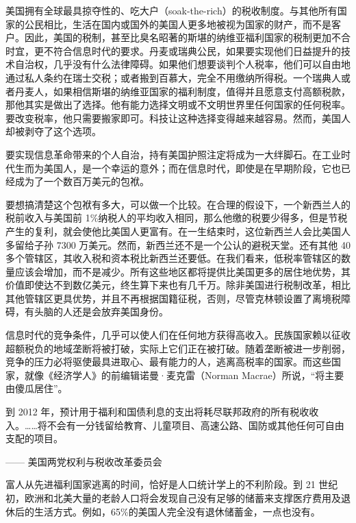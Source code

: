 美国拥有全球最具掠夺性的、吃大户（soak-the-rich）的税收制度。与其他所有国家的公民相比，生活在国内或国外的美国人更多地被视为国家的财产，而不是客户。因此，美国的税制，甚至比臭名昭著的斯堪的纳维亚福利国家的税制更加不合时宜，更不符合信息时代的要求。丹麦或瑞典公民，如果要实现他们日益提升的技术自治权，几乎没有什么法律障碍。如果他们想要谈判个人税率，他们可以自由地通过私人条约在瑞士交税；或者搬到百慕大，完全不用缴纳所得税。一个瑞典人或者丹麦人，如果相信斯堪的纳维亚国家的福利制度，值得并且愿意支付高额税款，那他其实是做出了选择。他有能力选择文明或不文明世界里任何国家的任何税率。要改变税率，他只需要搬家即可。科技让这种选择变得越来越容易。然而，美国人却被剥夺了这个选项。

要实现信息革命带来的个人自治，持有美国护照注定将成为一大绊脚石。在工业时代生而为美国人，是一个幸运的意外；而在信息时代，即使是在早期阶段，它也已经成为了一个数百万美元的包袱。

要想搞清楚这个包袱有多大，可以做一个比较。在合理的假设下，一个新西兰人的税前收入与美国前 1\%纳税人的平均收入相同，那么他缴的税要少得多，但是节税产生的复利，就会使他比美国人更富有。在一生结束时，这位新西兰人会比美国人多留给子孙 7300 万美元。然而，新西兰还不是一个公认的避税天堂。还有其他 40 多个管辖区，其收入税和资本税比新西兰还要低。在我们看来，低税率管辖区的数量应该会增加，而不是减少。所有这些地区都将提供比美国更多的居住地优势，其价值即使达不到数亿美元，终生算下来也有几千万。除非美国进行税制改革，相比其他管辖区更具优势，并且不再根据国籍征税，否则，尽管克林顿设置了离境税障碍，有头脑的人还是会放弃美国身份。

信息时代的竞争条件，几乎可以使人们在任何地方获得高收入。民族国家赖以征收超额税负的地域垄断将被打破，实际上它们正在被打破。随着垄断被进一步削弱，竞争的压力必将驱使最具进取心、最有能力的人，逃离高税率的国家。而这些国家，就像《经济学人》的前编辑诺曼·麦克雷（Norman Macrae）所说，“将主要由傻瓜居住”。

\begin{tcolorbox}
\kaishu 到 2012 年，预计用于福利和国债利息的支出将耗尽联邦政府的所有税收收入。……将不会有一分钱留给教育、儿童项目、高速公路、国防或其他任何可自由支配的项目。
\begin{flushright}
—— 美国两党权利与税收改革委员会
\end{flushright}
\end{tcolorbox}


富人从先进福利国家逃离的时间，恰好是人口统计学上的不利阶段。到 21 世纪初，欧洲和北美大量的老龄人口将会发现自己没有足够的储蓄来支撑医疗费用及退休后的生活方式。例如，65\%的美国人完全没有退休储蓄金，一点也没有。


